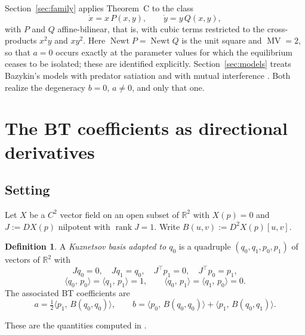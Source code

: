 \documentclass[12pt]{article}
\theoremstyle{plain}
\theoremstyle{definition}
\newtheorem{definition}[theorem]{Definition}
\theoremstyle{remark}
\newcommand{\R}{\mathbb{R}}
\DeclareMathOperator{\rank}{rank}
\DeclareMathOperator{\MV}{MV}
\DeclareMathOperator{\Newt}{Newt}
\newcommand{\ip}[2]{\langle #1,\, #2\rangle}
\begin{document}
	Section~\ref{sec:family} applies Theorem~C to the class
	\[
	\dot x=x\,P(x,y),\qquad \dot y=y\,Q(x,y),
	\]
	with $P$ and $Q$ affine-bilinear, that is, with cubic terms restricted
	to the cross-products $x^{2}y$ and $xy^{2}$.  Here $\Newt P=\Newt Q$ is
	the unit square and $\MV=2$, so that $a=0$ occurs exactly at the
	parameter values for which the equilibrium ceases to be isolated; these
	are identified explicitly.  Section~\ref{sec:models} treats Bazykin's
	models with predator satiation and with mutual interference
	\cite{Bazykin1998}.  Both realize the degeneracy $b=0$, $a\neq0$, and
	only that one.
	
	
	\section{The BT coefficients as directional derivatives}
	\label{sec:intrinsic}
	
	\subsection{Setting}
	
	Let $X$ be a $C^{2}$ vector field on an open subset of $\R^{2}$ with
	$X(p)=0$ and $J:=DX(p)$ nilpotent with $\rank J=1$.  Write
	$B(u,v):=D^{2}X(p)[u,v]$.
	
	\begin{definition}\label{def:kbasis}
		A \emph{Kuznetsov basis adapted to $q_{0}$} is a quadruple
		$(q_{0},q_{1},p_{0},p_{1})$ of vectors of $\R^{2}$ with
		\begin{equation}\label{eq:kbasis}
			Jq_{0}=0,\quad Jq_{1}=q_{0},\quad
			J^{\top}p_{1}=0,\quad J^{\top}p_{0}=p_{1},
		\end{equation}
		\begin{equation}\label{eq:biorth}
			\ip{q_{0}}{p_{0}}=\ip{q_{1}}{p_{1}}=1,\qquad
			\ip{q_{0}}{p_{1}}=\ip{q_{1}}{p_{0}}=0 .
		\end{equation}
		The associated BT coefficients are
		\begin{equation}\label{eq:abdef}
			a=\tfrac12\ip{p_{1}}{B(q_{0},q_{0})},\qquad
			b=\ip{p_{0}}{B(q_{0},q_{0})}+\ip{p_{1}}{B(q_{0},q_{1})} .
		\end{equation}
	\end{definition}
	
	These are the quantities computed in \cite{Kuznetsov2004,Kuznetsov2005}.
	
\end{document}
